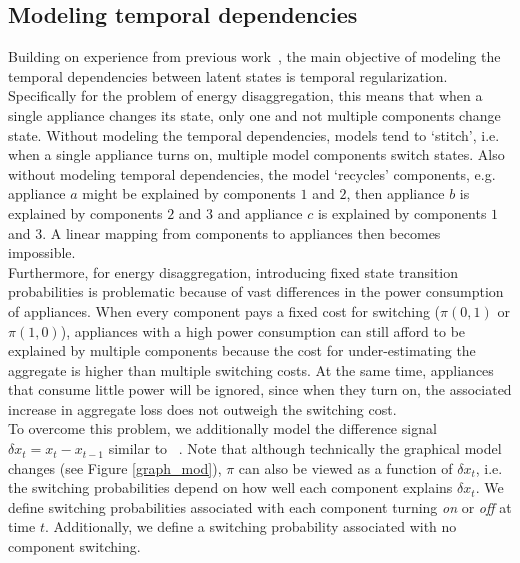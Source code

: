 \subsection{Modeling temporal dependencies}
Building on experience from previous work~\cite{lange2016bolt}, the main objective of modeling the temporal dependencies between latent states is temporal regularization. Specifically for the problem of energy disaggregation, this means that when a single appliance changes its state, only one and not multiple components change state. Without modeling the temporal dependencies, models tend to `stitch', i.e. when a single appliance turns on, multiple model components switch states. Also without modeling temporal dependencies, the model `recycles' components, e.g. appliance $a$ might be explained by components $1$ and $2$, then appliance $b$ is explained by components $2$ and $3$ and appliance $c$ is explained by components $1$ and $3$. A linear mapping from components to appliances then becomes impossible.\\
Furthermore, for energy disaggregation, introducing fixed state transition probabilities is problematic because of vast differences in the power consumption of appliances. When every component pays a fixed cost for switching ($\pi(0,1)$ or $\pi(1,0)$), appliances with a high power consumption can still afford to be explained by multiple components because the cost for under-estimating the aggregate is higher than multiple switching costs. At the same time, appliances that consume little power will be ignored, since when they turn on, the associated increase in aggregate loss does not outweigh the switching cost.\\
To overcome this problem, we additionally model the difference signal $\delta x_t = x_t - x_{t-1}$ similar to ~\cite{kolter2012fhmm}. Note that although technically the graphical model changes (see Figure \ref{graph_mod}), $\pi$ can also be viewed as a function of $\delta x_t$, i.e. the switching probabilities depend on how well each component explains $\delta x_t$. We define switching probabilities associated with each component turning \emph{on} or \emph{off} at time $t$. Additionally, we define a switching probability associated with no component switching.

